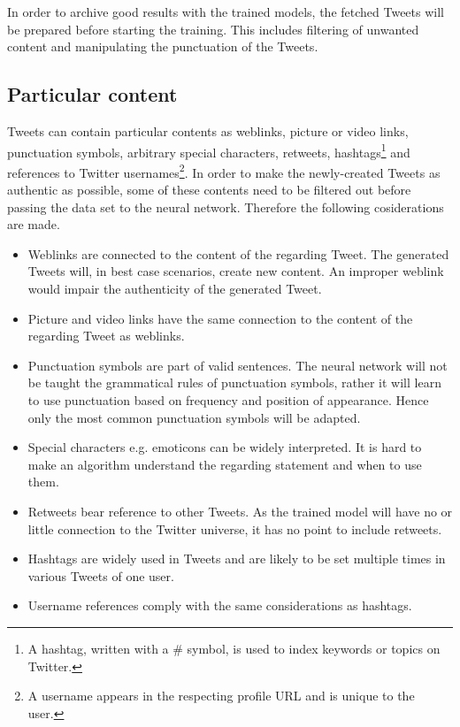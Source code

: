 \documentclass[hidelinks, conference]{IEEEtran}
\begin{document}
In order to archive good results with the trained models, the fetched Tweets will be prepared before starting the training. This includes filtering of unwanted content and manipulating the punctuation of the Tweets. 

\subsection{Particular content}\label{subsec_particular_content}

Tweets can contain particular contents as weblinks, picture or video links, punctuation symbols, arbitrary special characters, retweets, hashtags\footnote{A hashtag, written with a \# symbol, is used to index keywords or topics on Twitter.} and references to Twitter usernames\footnote{A username appears in the respecting profile URL and is unique to the user.}. In order to make the newly-created Tweets as authentic as possible, some of these contents need to be filtered out before passing the data set to the neural network. Therefore the following cosiderations are made.\\

\begin{itemize}
\item Weblinks are connected to the content of the regarding Tweet. The generated Tweets will, in best case scenarios, create new content. An improper weblink would impair the authenticity of the generated Tweet.
\item Picture and video links have the same connection to the content of the regarding Tweet as weblinks.
\item Punctuation symbols are part of valid sentences. The neural network will not be taught the grammatical rules of punctuation symbols, rather it will learn to use punctuation based on frequency and position of appearance. Hence only the most common punctuation symbols will be adapted.
\item Special characters e.g. emoticons can be widely interpreted. It is hard to make an algorithm understand the regarding statement and when to use them. 
\item Retweets bear reference to other Tweets. As the trained model will have no or little connection to the Twitter universe, it has no point to include retweets.
\item Hashtags are widely used in Tweets and are likely to be set multiple times in various Tweets of one user.
\item Username references comply with the same considerations as hashtags.
\end{itemize}
\end{document}
